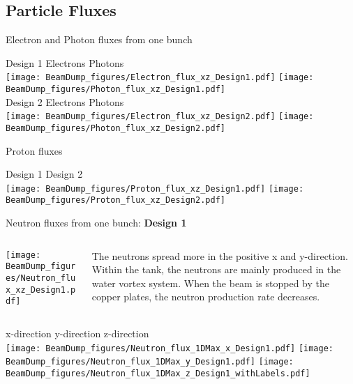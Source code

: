 \documentclass[xcolor={dvipsnames}]{beamer}
\begin{document}
\subsection{Particle Fluxes}
\begin{frame}{Electron and Photon fluxes from one bunch}
\begin{center}
Design 1 \hspace*{1.4cm} Electrons \hfill Photons \hspace*{3.1cm} \\
 \texttt{[image: BeamDump\_figures/Electron\_flux\_xz\_Design1.pdf]}
  \texttt{[image: BeamDump\_figures/Photon\_flux\_xz\_Design1.pdf]}\\
Design 2 \hspace*{1.4cm} Electrons \hfill Photons \hspace*{3.1cm} \\ 
\texttt{[image: BeamDump\_figures/Electron\_flux\_xz\_Design2.pdf]}
  \texttt{[image: BeamDump\_figures/Photon\_flux\_xz\_Design2.pdf]}
\end{center}
\end{frame}
\begin{frame}{Proton fluxes}
\begin{center}
\hspace*{2cm} Design 1 \hfill Design 2 \hspace*{2cm} \\
  \texttt{[image: BeamDump\_figures/Proton\_flux\_xz\_Design1.pdf]}
    \texttt{[image: BeamDump\_figures/Proton\_flux\_xz\_Design2.pdf]}
\end{center}
\end{frame}
\begin{frame}{Neutron fluxes from one bunch: \textbf{Design 1}}
\begin{columns}
 \begin{column}{0.5\textwidth}
    \texttt{[image: BeamDump\_figures/Neutron\_flux\_xz\_Design1.pdf]}
 \end{column}
 \begin{column}{0.5\textwidth}
  The neutrons spread more in the positive x and y-direction. Within the tank, the neutrons are mainly produced in the water vortex system. When the beam is stopped by the copper plates, the neutron production rate decreases.
 \end{column}
\end{columns}
\hspace*{1cm} x-direction \hfill y-direction \hfill z-direction \hspace*{1cm} \\
  \texttt{[image: BeamDump\_figures/Neutron\_flux\_1DMax\_x\_Design1.pdf]}\hfill
  \texttt{[image: BeamDump\_figures/Neutron\_flux\_1DMax\_y\_Design1.pdf]}\hfill
  \texttt{[image: BeamDump\_figures/Neutron\_flux\_1DMax\_z\_Design1\_withLabels.pdf]}
\end{frame}
\end{document}
